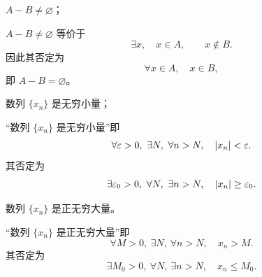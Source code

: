 \begin{xexercise}[6]
$A-B\ne\varnothing$；
\end{xexercise}
\begin{xsolution}
$A-B\ne\varnothing$ 等价于
  \[
    \exists x,\quad x\in A,\qquad x\notin B.
  \]
  因此其否定为
  \[
    \forall x\in A,\quad x\in B,
  \]
  即 $A-B=\varnothing$。
\end{xsolution}


\begin{xexercise}[7]
数列 $\{x_n\}$ 是无穷小量；
\end{xexercise}
\begin{xsolution}
“数列 $\{x_n\}$ 是无穷小量”即
  \[
    \forall\varepsilon>0,\ \exists N,\ \forall n>N,
    \quad \abs{x_n}<\varepsilon.
  \]
  其否定为
  \[
    \exists\varepsilon_0>0,\ \forall N,\ \exists n>N,
    \quad \lvert x_n\rvert\ge\varepsilon_0.
  \]
\end{xsolution}


\begin{xexercise}[8]
数列 $\{x_n\}$ 是正无穷大量。
\end{xexercise}
\begin{xsolution}
“数列 $\{x_n\}$ 是正无穷大量”即
  \[
    \forall M>0,\ \exists N,\ \forall n>N,
    \quad x_n>M.
  \]
  其否定为
  \[
    \exists M_0>0,\ \forall N,\ \exists n>N,
    \quad x_n\le M_0.
  \]
\end{xsolution}

